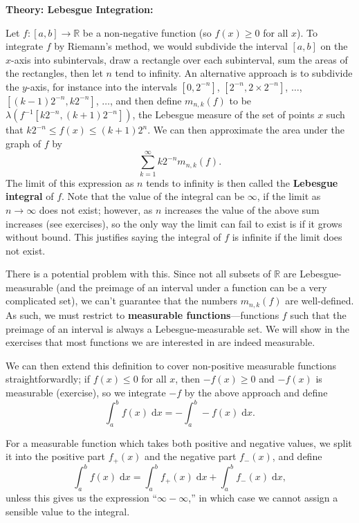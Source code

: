 \documentclass{article}
\newcommand{\diff}{\;\mathrm{d}}
\begin{document}
\clearpage








\textbf{Theory: Lebesgue Integration:}\bigskip


Let $f:[a,b]\to \mathbb{R}$ be a non-negative function (so $f(x)\geq 0$ for all $x$). To integrate $f$ by Riemann's method, we would subdivide the interval $[a,b]$ on the $x$-axis into subintervals, draw a rectangle over each subinterval, sum the areas of the rectangles, then let $n$ tend to infinity. An alternative approach is to subdivide the $y$-axis, for instance into the intervals $[0,2^{-n}]$, $[2^{-n}, 2\times 2^{-n}]$, $\hdots$, $[(k-1)2^{-n},k2^{-n}]$, $\hdots$, and then define $m_{n,k}(f)$ to be $\lambda\left(f^{-1}[k2^{-n},(k+1)2^{-n}]\right)$, the Lebesgue measure of the set of points $x$ such that $k2^{-n}\leq f(x)\leq (k+1)2^n$. We can then approximate the area under the graph of $f$ by
\[\sum_{k=1}^\infty k2^{-n}m_{n,k}(f).\]
The limit of this expression as $n$ tends to infinity is then called the \textbf{Lebesgue integral} of $f$. Note that the value of the integral can be $\infty$, if the limit as $n\to \infty$ does not exist; however, as $n$ increases the value of the above sum increases (see exercises), so the only way the limit can fail to exist is if it grows without bound. This justifies saying the integral of $f$ is infinite if the limit does not exist.\medskip

There is a potential problem with this. Since not all subsets of $\mathbb{R}$ are Lebesgue-measurable (and the preimage of an interval under a function can be a very complicated set), we can't guarantee that the numbers $m_{n,k}(f)$ are well-defined. As such, we must restrict to \textbf{measurable functions}---functions $f$ such that the preimage of an interval is always a Lebesgue-measurable set. We will show in the exercises that most functions we are interested in are indeed measurable.\medskip

We can then extend this definition to cover non-positive measurable functions straightforwardly; if $f(x)\leq 0$ for all $x$, then $-f(x)\geq 0$ and $-f(x)$ is measurable (exercise), so we integrate $-f$ by the above approach and define
\[\int_a^b f(x)\diff x = -\int_a^b -f(x)\diff x.\]

For a measurable function which takes both positive and negative values, we split it into the positive part $f_+(x)$ and the negative part $f_-(x)$, and define
\[\int_a^b f(x)\diff x = \int_a^b f_+(x)\diff x + \int _a^b f_-(x)\diff x,\]
unless this gives us the expression ``$\infty-\infty$,'' in which case we cannot assign a sensible value to the integral.
\end{document}
